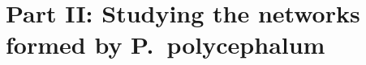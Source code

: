 \documentclass[	hyperref={pdfpagelabels=false}, xcolor=dvipsnames,
		11pt]{beamer}
\begin{document}

\section{Part II: Studying the networks formed by P.~polycephalum}



		 
\end{document}
